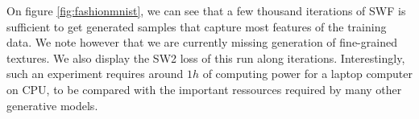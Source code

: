 

On figure \ref{fig:fashionmnist}, we can see that a few thousand iterations of SWF is sufficient to get generated samples that capture most features of the training data. We note however that we are currently missing generation of fine-grained textures. We also display the SW2 loss of this run along iterations. Interestingly, such an experiment requires around $1h$ of computing power for a laptop computer on CPU, to be compared with the important ressources required by many other generative models.

